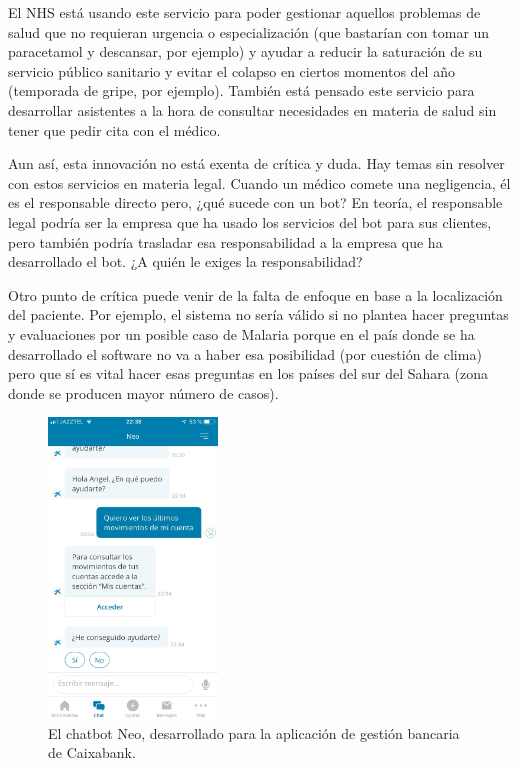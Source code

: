 \documentclass[spanish,12pt, a4paper, twoside]{paper}
\begin{document}
El NHS está usando este servicio para poder gestionar aquellos problemas de salud que no requieran urgencia o especialización (que bastarían con tomar un paracetamol y descansar, por ejemplo) y ayudar a reducir la saturación de su servicio público sanitario y evitar el colapso en ciertos momentos del año (temporada de gripe, por ejemplo).
También está pensado este servicio para desarrollar asistentes a la hora de consultar necesidades en materia de salud sin tener que pedir cita con el médico.
\newline

Aun así, esta innovación no está exenta de crítica y duda. Hay temas sin resolver con estos servicios en materia legal. Cuando un médico comete una negligencia, él es el responsable directo pero, ¿qué sucede con un bot? En teoría, el responsable legal podría ser la empresa que ha usado los servicios del bot para sus clientes, pero también podría trasladar esa responsabilidad a la empresa que ha desarrollado el bot. ¿A quién le exiges la responsabilidad?

Otro punto de crítica puede venir de la falta de enfoque en base a la localización del paciente. Por ejemplo, el sistema no sería válido si no plantea hacer preguntas y evaluaciones por un posible caso de Malaria porque en el país donde se ha desarrollado el software no va a haber esa posibilidad (por cuestión de clima) pero que sí es vital hacer esas preguntas en los países del sur del Sahara (zona donde se producen mayor número de casos).
\newpage

\begin{figure}
\centering
	\includegraphics[width=0.4\textwidth]{recursos/neoCaixabank}
\caption{El chatbot Neo, desarrollado para la aplicación de gestión bancaria de Caixabank.}
\label{fig:Neo, bot de CaixaBank}
\end{figure}
\end{document}
